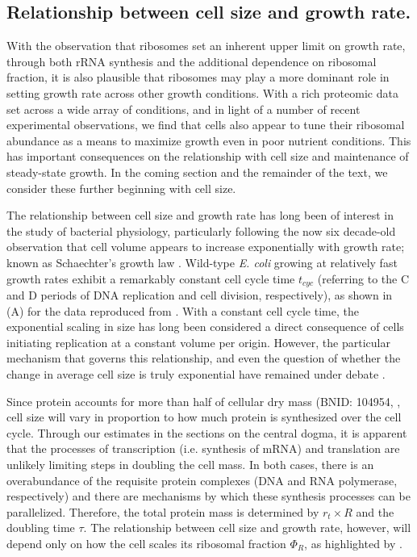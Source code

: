 \subsection{Relationship between cell size and growth rate.}
With the observation that ribosomes set an inherent upper limit on growth
rate, through both rRNA synthesis and the additional dependence on ribosomal
fraction, it is also plausible that ribosomes may play a more dominant role
in setting growth rate across other growth conditions. With a rich proteomic
data set across a wide array of conditions, and in light of a number of
recent experimental observations, we find that cells also appear to tune
their ribosomal abundance as a means to maximize growth even in poor nutrient
conditions. This has important consequences on the relationship with cell
size and maintenance of steady-state growth. In the coming section and the
remainder of the text, we consider these further beginning with cell size.

The relationship between cell size and growth rate has long been of interest in
the study of bacterial physiology, particularly following the now six decade-old observation
that cell volume appears to increase exponentially with growth rate; known as
Schaechter's growth law  \citep{schaechter1958, taheriaraghi2015}. Wild-type
\textit{E. coli} growing at relatively fast growth rates exhibit a remarkably
constant cell cycle time $t_{cyc}$ (referring to the C and D periods of DNA
replication and cell division, respectively), as shown in
(A) for the data reproduced from \cite{si2017}.
With a constant cell cycle time, the exponential scaling in size has long been
considered a direct consequence of cells initiating replication at a constant
volume per origin. However, the particular mechanism that governs this
relationship, and even the question of whether the change in average cell size
is truly exponential  have remained under debate \citep{si2017, harris2018}.

Since protein accounts for more than half of cellular dry mass (BNID: 104954,
\cite{milo2010, bremer2008, basan2015}, cell size will vary in proportion to how much protein is
synthesized over the cell cycle.  Through our estimates in the sections on the
central dogma, it is apparent that the processes of transcription (i.e.
synthesis of mRNA) and translation are unlikely limiting steps in doubling the
cell mass. In both cases, there is an overabundance of the requisite protein
complexes (DNA and RNA polymerase, respectively) and there are mechanisms by
which these synthesis processes can be parallelized. Therefore, the total protein mass is determined by $r_t \times R$ and the doubling time
$\tau$. The relationship between cell size and growth rate, however, will
depend only on how the cell scales its ribosomal fraction $\Phi_R$, as highlighted by
.


